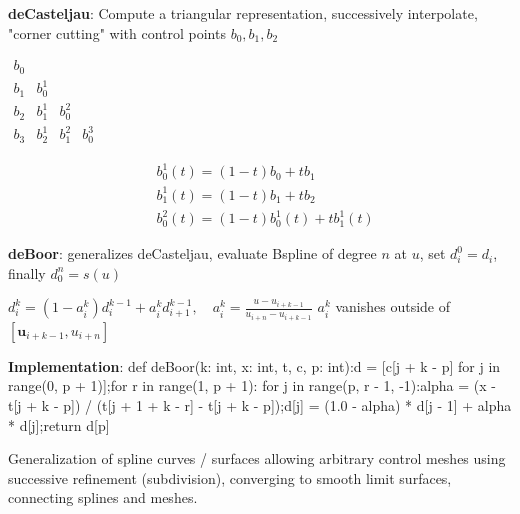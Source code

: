 \textbf{deCasteljau}: Compute a triangular representation, successively interpolate, "corner cutting" with control points $ b_0, b_1, b_2$\\
\begin{minipage}{0.20\linewidth} 
$\begin{array}{llll}b_0 & & & \\ b_1 & b_0^1 & & \\ b_2 & b_1^1 & b_0^2 & \\ b_3 & b_2^1 & b_1^2 & b_0^3\end{array}$
\end{minipage}
\hfill
\begin{minipage}{0.75\linewidth} 
$$
\begin{aligned}
& b_0^1(t)=(1-t) b_0+t b_1 \\
& b_1^1(t)=(1-t) b_1+t b_2 \\
& b_0^2(t)=(1-t) b_0^1(t)+t b_1^1(t)
\end{aligned}
$$

\end{minipage}

\textbf{deBoor}: generalizes deCasteljau, evaluate Bspline of degree $n$ at $u$, set $d_i^0=d_i$, finally $d_0^n=s(u)$

$
d_i^k=\left(1-a_i^k\right) d_i^{k-1}+a_i^k d_{i+1}^{k-1}, \quad a_i^k=\frac{u-u_{i+k-1}}{u_{i+n}-u_{i+k-1}}
$
$a_i^k$ vanishes outside of $\left[\boldsymbol{u}_{i+k-1}, u_{i+n}\right]$ 

\textbf{Implementation}:
\textcolor{col1}{def deBoor(k: int, x: int, t, c, p: int):}\textcolor{col2}{d = [c[j + k - p] for j in range(0, p + 1)];for r in range(1, p + 1):}\textcolor{col3}{ for j in range(p, r - 1, -1):}\textcolor{col4}{alpha = (x - t[j + k - p]) / (t[j + 1 + k - r] - t[j + k - p]);d[j] = (1.0 - alpha) * d[j - 1] + alpha * d[j];}\textcolor{col2}{return d[p]}
 
Generalization of spline curves / surfaces allowing arbitrary control meshes using successive refinement (subdivision), converging to smooth limit surfaces, connecting splines and meshes.

